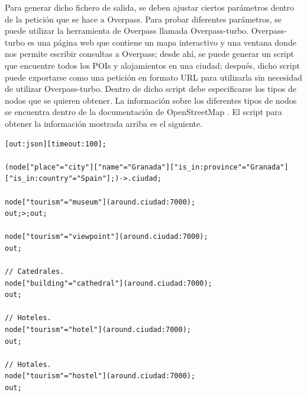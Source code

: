 Para generar dicho fichero de salida, se deben ajustar ciertos parámetros dentro de la petición que se hace a Overpass. Para probar diferentes parámetros, se puede utilizar la herramienta de Overpass llamada Overpass-turbo.\newline
Overpass-turbo es una página web que contiene un mapa interactivo y una ventana donde nos permite escribir consultas a Overpass; desde ahí, se puede generar un script que encuentre todos los POIs y alojamientos en una ciudad; después, dicho script puede exportarse como una petición en formato URL para utilizarla sin necesidad de utilizar Overpass-turbo. Dentro de dicho script debe especificarse los tipos de nodos que se quieren obtener. La información sobre los diferentes tipos de nodos se encuentra dentro de la documentación de OpenStreetMap \cite{openstreetmap_doc}. El script para obtener la información mostrada arriba es el siguiente. \newline
\begin{lstlisting}[caption=Script para encontrar todos los POIs y alojamientos de una ciudad.]
[out:json][timeout:100]; 

(node["place"="city"]["name"="Granada"]["is_in:province"="Granada"]["is_in:country"="Spain"];)->.ciudad; 

node["tourism"="museum"](around.ciudad:7000);
out;>;out;

node["tourism"="viewpoint"](around.ciudad:7000);
out;

// Catedrales.
node["building"="cathedral"](around.ciudad:7000);
out;

// Hoteles.
node["tourism"="hotel"](around.ciudad:7000);
out;

// Hotales.
node["tourism"="hostel"](around.ciudad:7000);
out;
\end{lstlisting}

